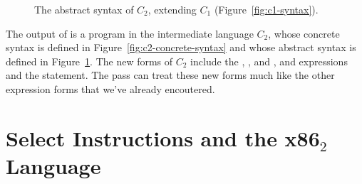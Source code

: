 \documentclass[11pt]{book}
\newcommand{\gray}[1]{{\color{gray} #1}}
\begin{document}
\begin{figure}[tp]
\fbox{
  \begin{minipage}{0.96\textwidth}
    \small
\[
\begin{array}{lcl}
\Atm &::=& \gray{ \INT{\Int} \mid \VAR{\Var} \mid \BOOL{\itm{bool}} }\\
\itm{cmp} &::= & \gray{  \key{eq?} \mid \key{<} } \\
\Exp &::= & \gray{ \Atm \mid \READ{} } \\
   &\mid& \gray{ \NEG{\Atm} \mid \ADD{\Atm}{\Atm} }\\
   &\mid& \gray{ \UNIOP{\key{not}}{\Atm} \mid \BINOP{\itm{cmp}}{\Atm}{\Atm}  } \\
   &\mid& (\key{Allocate} \,\itm{int}\,\itm{type}) \\
   &\mid& \BINOP{\key{'vector-ref}}{\Atm}{\INT{\Int}}  \\
   &\mid& (\key{Prim}~\key{'vector-set!}\,(\key{list}\,\Atm\,\INT{\Int}\,\Atm))\\
   &\mid& (\key{GlobalValue} \,\Var) \mid (\key{Void})\\
\Stmt &::=& \gray{ \ASSIGN{\VAR{\Var}}{\Exp} } 
       \mid (\key{Collect} \,\itm{int}) \\
\Tail &::= & \gray{ \RETURN{\Exp} \mid \SEQ{\Stmt}{\Tail} 
       \mid \GOTO{\itm{label}} } \\
      &\mid& \gray{ \IFSTMT{\BINOP{\itm{cmp}}{\Atm}{\Atm}}{\GOTO{\itm{label}}}{\GOTO{\itm{label}}}  }\\
C_2 & ::= & \gray{ \PROGRAM{\itm{info}}{\CFG{(\itm{label}\,\key{.}\,\Tail)\ldots}} }
\end{array}
\]
\end{minipage}
}
\caption{The abstract syntax of $C_2$, extending $C_1$
   (Figure~\ref{fig:c1-syntax}).}
\label{fig:c2-syntax}
\end{figure}

The output of  is a program in the
intermediate language $C_2$, whose concrete syntax is defined in
Figure~\ref{fig:c2-concrete-syntax} and whose abstract syntax is
defined in Figure~\ref{fig:c2-syntax}.  The new forms of $C_2$ include
the , , and , and
 expressions and the  statement.  The
 pass can treat these new forms much like the
other expression forms that we've already encoutered.


\section{Select Instructions and the x86$_2$ Language}
\label{sec:select-instructions-gc}
\end{document}
